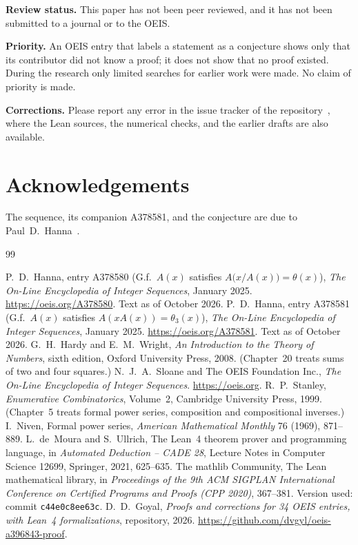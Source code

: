 \documentclass[11pt,a4paper]{article}
\theoremstyle{definition}
\theoremstyle{remark}
\newcommand{\para}[1]{\par\medskip\noindent\textbf{#1}\enspace}
\begin{document}
\para{Review status.} This paper has not been peer reviewed, and it has not been submitted to a journal or to the OEIS.

\para{Priority.} An OEIS entry that labels a statement as a conjecture shows only that its contributor did not know
a proof; it does not show that no proof existed. During the research only limited searches for earlier work were
made. No claim of priority is made.

\para{Corrections.} Please report any error in the issue tracker of the repository~\cite{repo}, where the Lean
sources, the numerical checks, and the earlier drafts are also available.

\section*{Acknowledgements}
The sequence, its companion A378581, and the conjecture are due to Paul~D.~Hanna~\cite{oeis,oeisother}.

\begin{thebibliography}{99}\small
\raggedright
{} P.~D.~Hanna, entry A378580 (G.f.\ $A(x)$ satisfies $A\bigl(x/A(x)\bigr)=\theta(x)$), \emph{The On-Line Encyclopedia of Integer Sequences}, January 2025. \url{https://oeis.org/A378580}. Text as of October 2026.
 P.~D.~Hanna, entry A378581 (G.f.\ $A(x)$ satisfies $A(xA(x))=\theta_3(x)$), \emph{The On-Line Encyclopedia of Integer Sequences}, January 2025. \url{https://oeis.org/A378581}. Text as of October 2026.
 G.~H.~Hardy and E.~M.~Wright, \emph{An Introduction to the Theory of Numbers}, sixth edition, Oxford University Press, 2008. (Chapter~20 treats sums of two and four squares.)
 N.~J.~A.~Sloane and The OEIS Foundation Inc., \emph{The On-Line Encyclopedia of Integer Sequences}. \url{https://oeis.org}.
 R.~P.~Stanley, \emph{Enumerative Combinatorics}, Volume~2, Cambridge University Press, 1999. (Chapter~5 treats formal power series, composition and compositional inverses.)
 I.~Niven, Formal power series, \emph{American Mathematical Monthly} 76 (1969), 871--889.
 L.~de~Moura and S.~Ullrich, The Lean~4 theorem prover and programming language, in \emph{Automated Deduction -- CADE 28}, Lecture Notes in Computer Science 12699, Springer, 2021, 625--635.
 The mathlib Community, The Lean mathematical library, in \emph{Proceedings of the 9th ACM SIGPLAN International Conference on Certified Programs and Proofs (CPP 2020)}, 367--381. Version used: commit \texttt{c44e0c8ee63c}.
 D.~D.~Goyal, \emph{Proofs and corrections for 34 OEIS entries, with Lean~4 formalizations}, repository, 2026. \url{https://github.com/dvgyl/oeis-a396843-proof}.
\end{thebibliography}
\end{document}
